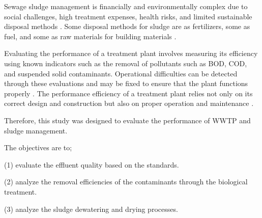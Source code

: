 Sewage sludge management is financially and environmentally complex due to social challenges, high treatment expenses, health risks, and limited sustainable disposal methods \cite{Fuerhacker2011}. Some disposal methods for sludge are as fertilizers, some as fuel, and some as raw materials for building materials \cite{Bratina2016}.
 
Evaluating the performance of a treatment plant involves measuring its efficiency using known indicators such as the removal of pollutants such as \ac{BOD}, \ac{COD}, and suspended solid contaminants. Operational difficulties can be detected through these evaluations and may be fixed to ensure that the plant functions properly \cite{Khan2018}. The performance efficiency of a treatment plant relies not only on its correct design and construction but also on proper operation and maintenance \cite{Kumar2010}.

 
Therefore, this study was designed to evaluate the performance of \ac{WWTP} and sludge management.


The objectives are to; 
 
 (1) evaluate the effluent quality based on the standards. 
 
 (2) analyze the removal efficiencies of the contaminants through the biological treatment.
 
 (3) analyze the sludge dewatering and drying processes.